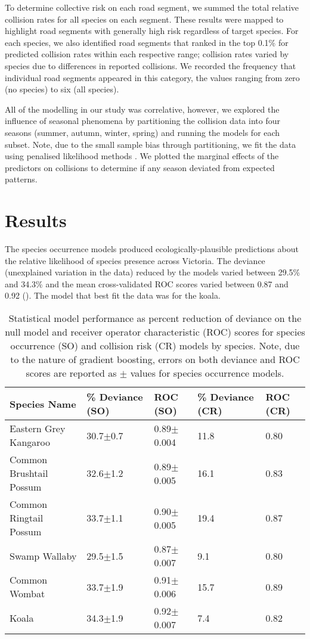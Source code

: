 To determine collective risk on each road segment, we summed the total relative collision rates for all species on each segment.  These results were mapped to highlight road segments with generally high risk regardless of target species. For each species, we also identified road segments that ranked in the top 0.1\% for predicted collision rates within each respective range; collision rates varied by species due to differences in reported collisions. We recorded the frequency that individual road segments appeared in this category, the values ranging from zero (no species) to six (all species).

All of the modelling in our study was correlative, however, we explored the influence of seasonal phenomena by partitioning the collision data into four seasons (summer, autumn, winter, spring) and running the models for each subset. Note, due to the small sample bias through partitioning, we fit the data using penalised likelihood methods \citep{firt93}.  We plotted the marginal effects of the predictors on collisions to determine if any season deviated from expected patterns.

\section{Results}

The species occurrence models produced ecologically-plausible predictions about the relative likelihood of species presence across Victoria. The deviance (unexplained variation in the data) reduced by the models varied between 29.5\% and 34.3\% and the mean cross-validated ROC scores varied between 0.87 and 0.92 (). The model that best fit the data was for the koala. 

\begin{table}[!t]
\caption[Statistical model performance for six mammal species]{Statistical model performance as percent reduction of deviance on the null model and receiver operator characteristic (ROC) scores for species occurrence (SO) and collision risk (CR) models by species. Note, due to the nature of gradient boosting, errors on both deviance and ROC scores are reported as $\pm$ values for species occurrence models.}
\centering
\begin{tabularx}{0.9\textwidth}{lllll} \toprule
Species Name			&\% Deviance (SO)	&ROC (SO)			&\% Deviance (CR)	&ROC (CR)\\
\midrule 
Eastern Grey Kangaroo	& 30.7$\pm$0.7 		& 0.89$\pm$0.004	& 11.8 				& 0.80 \\ 
Common Brushtail Possum & 32.6$\pm$1.2 		& 0.89$\pm$0.005 	& 16.1 				& 0.83 \\ 
Common Ringtail Possum 	& 33.7$\pm$1.1 		& 0.90$\pm$0.005 	& 19.4 				& 0.87 \\ 
Swamp Wallaby		 	& 29.5$\pm$1.5 		& 0.87$\pm$0.007 	& 9.1 				& 0.80 \\ 
Common Wombat 			& 33.7$\pm$1.9 		& 0.91$\pm$0.006 	& 15.7 				& 0.89 \\ 
Koala 					& 34.3$\pm$1.9 		& 0.92$\pm$0.007 	& 7.4 				& 0.82 \\ 
\bottomrule
\end{tabularx}
\label{6sp_models}
\end{table}

